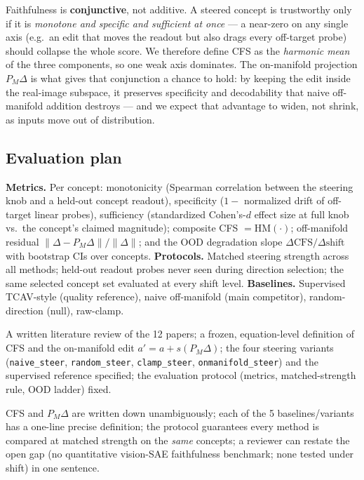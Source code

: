 \documentclass[11pt]{article}
\begin{document}
\begin{insightbox}
Faithfulness is \textbf{conjunctive}, not additive. A steered concept is trustworthy
only if it is \emph{monotone and specific and sufficient at once} --- a near-zero on
any single axis (e.g.\ an edit that moves the readout but also drags every off-target
probe) should collapse the whole score. We therefore define CFS as the \emph{harmonic
mean} of the three components, so one weak axis dominates. The on-manifold projection
$P_M\Delta$ is what gives that conjunction a chance to hold: by keeping the edit inside
the real-image subspace, it preserves specificity and decodability that naive
off-manifold addition destroys --- and we expect that advantage to widen, not shrink,
as inputs move out of distribution.
\end{insightbox}

\subsection*{Evaluation plan}
\textbf{Metrics.} Per concept: monotonicity (Spearman correlation between the steering
knob and a held-out concept readout), specificity ($1-$ normalized drift of off-target
linear probes), sufficiency (standardized Cohen's-$d$ effect size at full knob vs.\ the
concept's claimed magnitude); composite CFS $=\mathrm{HM}(\cdot)$; off-manifold
residual $\lVert\Delta-P_M\Delta\rVert/\lVert\Delta\rVert$; and the OOD degradation
slope $\Delta\mathrm{CFS}/\Delta\text{shift}$ with bootstrap CIs over concepts.
\textbf{Protocols.} Matched steering strength across all methods; held-out readout
probes never seen during direction selection; the same selected concept set evaluated
at every shift level. \textbf{Baselines.} Supervised TCAV-style (quality reference),
naive off-manifold (main competitor), random-direction (null), raw-clamp.

\begin{delivbox}
A written literature review of the 12 papers; a frozen, equation-level definition of
CFS and the on-manifold edit $a'=a+s(P_M\Delta)$; the four steering variants
(\texttt{naive\_steer}, \texttt{random\_steer}, \texttt{clamp\_steer},
\texttt{onmanifold\_steer}) and the supervised reference specified; the evaluation
protocol (metrics, matched-strength rule, OOD ladder) fixed.
\end{delivbox}
\begin{checkbox}
CFS and $P_M\Delta$ are written down unambiguously; each of the 5 baselines/variants has
a one-line precise definition; the protocol guarantees every method is compared at
matched strength on the \emph{same} concepts; a reviewer can restate the open gap
(no quantitative vision-SAE faithfulness benchmark; none tested under shift) in one
sentence.
\end{checkbox}
\end{document}
